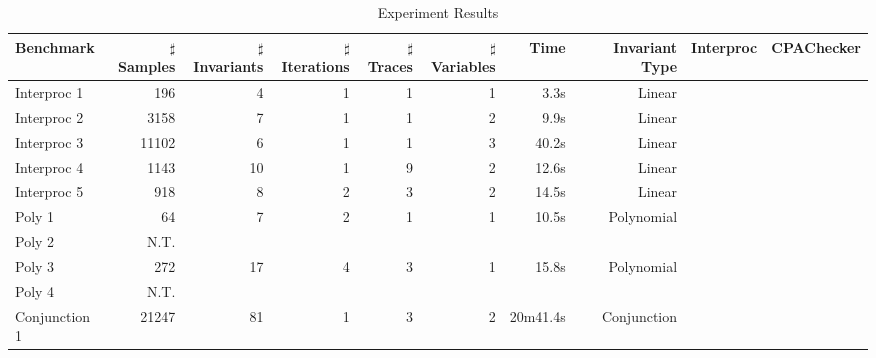 \begin{table*}[t]
    \begin{center}
    \begin{minipage}{\textwidth}
    \begin{adjustwidth}{-1in}{-1in}
    \begin{center}
    \begin{adjustbox}{max width=1.0\textwidth}
    \begin{tabular}{l | r | r | r | r | r | r | r | r | r}
        \hline\hline
        Benchmark 
            & $\sharp$Samples & $\sharp$Invariants & $\sharp$Iterations 
            & $\sharp$Traces & $\sharp$Variables
            & Time & Invariant Type 
            & Interproc & CPAChecker 
            \\
        \hline
        Interproc 1
            & 196 & 4 & 1 
            & 1 & 1
            & 3.3s & Linear 
            \\
        \hline
        Interproc 2
            & 3158 & 7 & 1 
            & 1 & 2
            & 9.9s & Linear 
            \\
        \hline
        Interproc 3
            & 11102 & 6 & 1
            & 1 & 3
            & 40.2s & Linear 
            \\
        \hline
        Interproc 4
            & 1143 & 10 & 1
            & 9 & 2
            & 12.6s & Linear 
            \\
        \hline
        Interproc 5
            & 918 & 8 & 2 
            & 3 & 2
            & 14.5s & Linear 
            \\
        \hline
        Poly 1
            & 64 & 7 & 2
            & 1 & 1 
            & 10.5s & Polynomial 
            \\
        \hline
        Poly 2 
            & N.T. 
            \\
        \hline
        Poly 3 
            & 272 & 17 & 4 
            & 3 & 1 
            & 15.8s & Polynomial 
            \\
        \hline
        Poly 4 
            & N.T. 
            \\
        \hline
        Conjunction 1
            & 21247 & 81 & 1 
            & 3 & 2 
            & 20m41.4s & Conjunction
            & 
            \\
        \hline
    \end{tabular}
    \end{adjustbox}
    \end{center}
    \end{adjustwidth}
    \end{minipage}
    \end{center}
    \caption{Experiment Results}
    \label{tab:experiments}
\end{table*}



